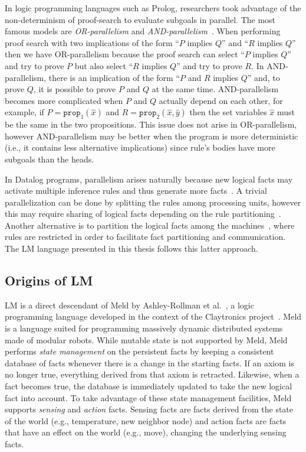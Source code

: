 In logic programming languages such as Prolog, researchers took advantage of the
non-determinism of proof-search to evaluate subgoals in parallel. The most
famous models are \emph{OR-parallelism} and
\emph{AND-parallelism}~\cite{Gupta:2001:PEP:504083.504085}. When performing
proof search with two implications of the form ``$P$ implies $Q$'' and ``$R$
implies $Q$'' then we have OR-parallelism because the proof search can select
``$P$ implies $Q$'' and try to prove $P$ but also select ``$R$ implies $Q$'' and
try to prove $R$. In AND-parallelism, there is an implication of the form ``$P$
and $R$ implies $Q$'' and, to prove $Q$, it is possible to prove $P$ and $Q$ at
the same time. AND-parallelism becomes more complicated when $P$ and $Q$
actually depend on each other, for example, if $P = \mathtt{prop}_1(\hat{x})$
and $R = \mathtt{prop}_2(\hat{x}, \hat{y})$ then the set variables $\hat{x}$
must be the same in the two propositions. This issue does not arise in
OR-parallelism, however AND-parallelism may be better when the program is more
deterministic (i.e., it contains less alternative implications) since rule's
bodies have more subgoals than the heads.

In Datalog programs, parallelism arises naturally because new logical facts may
activate multiple inference rules and thus generate more
facts~\cite{Ganguly:1990:FPP:93597.98724,Seib:1991:PDP:113413.113435,Wolfson:1988:DPL:971701.50242}.
A trivial parallelization can be done by splitting the rules among processing
units, however this may require sharing of logical facts depending on the rule
partitioning~\cite{Wolfson:1988:DPL:971701.50242}. Another alternative is to
partition the logical facts among the
machines~\cite{183073,Loo-condie-garofalakis-p2}, where rules are restricted in
order to facilitate fact partitioning and communication. The LM language
presented in this thesis follows this latter approach.

\subsection{Origins of LM}

LM is a direct descendant of Meld by Ashley-Rollman et
al.~\cite{ashley-rollman-iclp09,ashley-rollman-derosa-iros07wksp}, a logic
programming language developed in the context of the Claytronics
project~\cite{goldstein-computer05}. Meld is a language suited for programming
massively dynamic distributed systems made of modular robots. While mutable
state is not supported by Meld, Meld performs \emph{state management} on the
persistent facts by keeping a consistent database of facts whenever there is a
change in the starting facts. If an axiom is no longer true, everything derived
from that axiom is retracted. Likewise, when a fact becomes true, the database
is immediately updated to take the new logical fact into account. To take
advantage of these state management facilities, Meld supports \emph{sensing} and
\emph{action} facts. Sensing facts are facts derived from the state of the world
(e.g., temperature, new neighbor node) and action facts are facts that have an
effect on the world (e.g., move), changing the underlying sensing facts.

